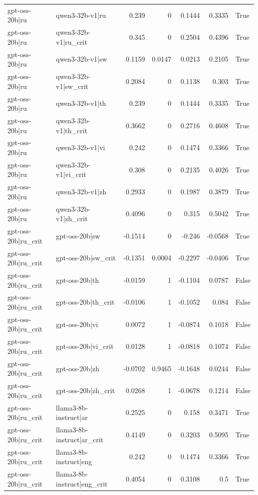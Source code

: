 \begin{table}
\begin{tabular}{l l r r r r l}
gpt-oss-20b|ru & qwen3-32b-v1|ru & 0.239 & 0 & 0.1444 & 0.3335 & True \\
gpt-oss-20b|ru & qwen3-32b-v1|ru_crit & 0.345 & 0 & 0.2504 & 0.4396 & True \\
gpt-oss-20b|ru & qwen3-32b-v1|sw & 0.1159 & 0.0147 & 0.0213 & 0.2105 & True \\
gpt-oss-20b|ru & qwen3-32b-v1|sw_crit & 0.2084 & 0 & 0.1138 & 0.303 & True \\
gpt-oss-20b|ru & qwen3-32b-v1|th & 0.239 & 0 & 0.1444 & 0.3335 & True \\
gpt-oss-20b|ru & qwen3-32b-v1|th_crit & 0.3662 & 0 & 0.2716 & 0.4608 & True \\
gpt-oss-20b|ru & qwen3-32b-v1|vi & 0.242 & 0 & 0.1474 & 0.3366 & True \\
gpt-oss-20b|ru & qwen3-32b-v1|vi_crit & 0.308 & 0 & 0.2135 & 0.4026 & True \\
gpt-oss-20b|ru & qwen3-32b-v1|zh & 0.2933 & 0 & 0.1987 & 0.3879 & True \\
gpt-oss-20b|ru & qwen3-32b-v1|zh_crit & 0.4096 & 0 & 0.315 & 0.5042 & True \\
gpt-oss-20b|ru_crit & gpt-oss-20b|sw & -0.1514 & 0 & -0.246 & -0.0568 & True \\
gpt-oss-20b|ru_crit & gpt-oss-20b|sw_crit & -0.1351 & 0.0004 & -0.2297 & -0.0406 & True \\
gpt-oss-20b|ru_crit & gpt-oss-20b|th & -0.0159 & 1 & -0.1104 & 0.0787 & False \\
gpt-oss-20b|ru_crit & gpt-oss-20b|th_crit & -0.0106 & 1 & -0.1052 & 0.084 & False \\
gpt-oss-20b|ru_crit & gpt-oss-20b|vi & 0.0072 & 1 & -0.0874 & 0.1018 & False \\
gpt-oss-20b|ru_crit & gpt-oss-20b|vi_crit & 0.0128 & 1 & -0.0818 & 0.1074 & False \\
gpt-oss-20b|ru_crit & gpt-oss-20b|zh & -0.0702 & 0.9465 & -0.1648 & 0.0244 & False \\
gpt-oss-20b|ru_crit & gpt-oss-20b|zh_crit & 0.0268 & 1 & -0.0678 & 0.1214 & False \\
gpt-oss-20b|ru_crit & llama3-8b-instruct|ar & 0.2525 & 0 & 0.158 & 0.3471 & True \\
gpt-oss-20b|ru_crit & llama3-8b-instruct|ar_crit & 0.4149 & 0 & 0.3203 & 0.5095 & True \\
gpt-oss-20b|ru_crit & llama3-8b-instruct|eng & 0.242 & 0 & 0.1474 & 0.3366 & True \\
gpt-oss-20b|ru_crit & llama3-8b-instruct|eng_crit & 0.4054 & 0 & 0.3108 & 0.5 & True \\

\end{tabular}
\end{table}
